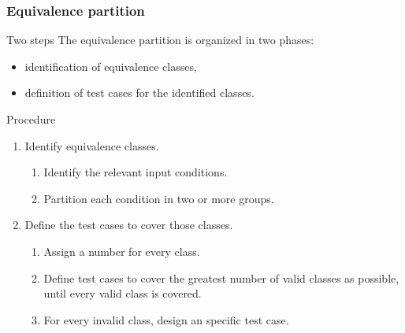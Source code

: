 \begin{frame}
\frametitle{Equivalence partition}
\label{procedure:equivalence-partition}

\begin{block:fact}{Two steps}
The equivalence partition is organized in two phases:
\begin{itemize}
	\item identification of equivalence classes,
	\item definition of test cases for the identified classes.
\end{itemize}
\end{block:fact}


\begin{block:procedure}{Procedure}
\begin{enumerate}
	\item Identify equivalence classes.
	\begin{enumerate}
		\item Identify the relevant input conditions.
		\item Partition each condition in two or more groups.
	\end{enumerate}

	\item Define the test cases to cover those classes.
	\begin{enumerate}
		\item Assign a number for every class.
		\item Define test cases to cover the greatest number of valid classes
		as possible, until every valid class is covered.
		\item For every invalid class, design an specific test case.
	\end{enumerate}
\end{enumerate}
\end{block:procedure}

\hfill
{}
\end{frame}


